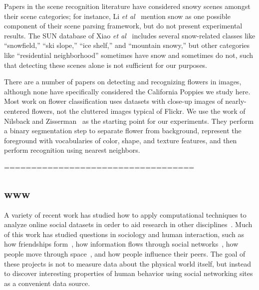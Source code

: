 Papers in the scene recognition literature have considered
snowy scenes amongst their scene categories; for instance, Li \textit{et
  al}~\cite{li2009totalscene,li2007event} mention snow as one possible
component of their scene parsing framework, but do not present
experimental results. The SUN database of Xiao \textit{et
  al}~\cite{XiaoHEOT10} includes several snow-related classes like
``snowfield,'' ``ski slope,'' ``ice shelf,'' and ``mountain snowy,''
but other categories like ``residential neighborhood'' sometimes have
snow and sometimes do not, such that detecting these scenes alone
is not sufficient for our purposes. 


 There are a number of papers on detecting
and recognizing flowers in images, although none have specifically
considered the California Poppies we study here.  Most 
work on flower classification uses datasets with 
close-up images of nearly-centered flowers, not the cluttered images
typical of Flickr. We use the work of Nilsback and Zisserman~\cite{flower2006cvpr} as the starting point for our experiments.
They perform a binary segmentation step to separate flower from background,
represent the foreground with vocabularies of color, shape, and texture features, 
and then perform recognition using nearest neighbors.
%
%


\hfill \break
\hfill \break
===================================
\hfill \break
\hfill \break
\subsection*{www}


A variety of recent work has studied how to apply computational
techniques to analyze online social datasets in order to aid research
in other disciplines~\cite{lazer09}. Much of this work has studied
questions in sociology and human interaction, such as how friendships
form~\cite{feedback08kdd}, how information flows through social
networks~\cite{libennowell08}, how people move through
space~\cite{brockmann06}, and how people influence their
peers\cite{anagnostpopoulos08}.  The goal of these projects is not to
measure data about the physical world itself, but instead to discover
interesting properties of human behavior using social networking sites
as a convenient data source.

